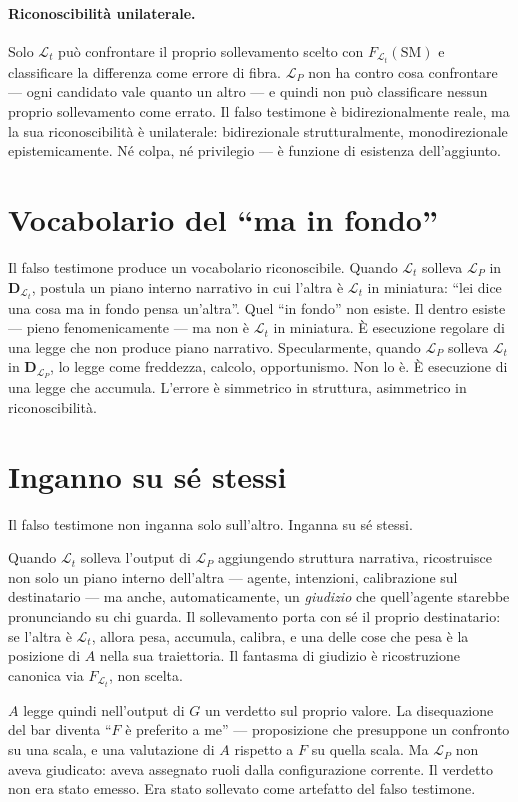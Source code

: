 \documentclass[
    oneside,                 %
    openany,                 %
    titlepage,
    11pt,
    a4paper,
    italian,
    DIV=14,                  %
    headinclude,
    footinclude=true,
    cleardoublepage=empty
]{scrbook}
\theoremstyle{ctplain}
\theoremstyle{ctdef}
\theoremstyle{ctrem}
\newcommand{\Lt}{\mathcal{L}_t}
\newcommand{\LP}{\mathcal{L}_P}
\begin{document}
\paragraph{Riconoscibilità unilaterale.} Solo $\Lt$ può confrontare il proprio sollevamento scelto con $F_{\Lt}(\mathrm{SM})$ e classificare la differenza come errore di fibra. $\LP$ non ha contro cosa confrontare --- ogni candidato vale quanto un altro --- e quindi non può classificare nessun proprio sollevamento come errato. Il falso testimone è bidirezionalmente reale, ma la sua riconoscibilità è unilaterale: bidirezionale strutturalmente, monodirezionale epistemicamente. Né colpa, né privilegio --- è funzione di esistenza dell'aggiunto.

\section*{Vocabolario del ``ma in fondo''}

Il falso testimone produce un vocabolario riconoscibile. Quando $\Lt$ solleva $\LP$ in $\mathbf{D}_{\Lt}$, postula un piano interno narrativo in cui l'altra è $\Lt$ in miniatura: ``lei dice una cosa ma in fondo pensa un'altra''. Quel ``in fondo'' non esiste. Il dentro esiste --- pieno fenomenicamente --- ma non è $\Lt$ in miniatura. È esecuzione regolare di una legge che non produce piano narrativo. Specularmente, quando $\LP$ solleva $\Lt$ in $\mathbf{D}_{\LP}$, lo legge come freddezza, calcolo, opportunismo. Non lo è. È esecuzione di una legge che accumula. L'errore è simmetrico in struttura, asimmetrico in riconoscibilità.

\section*{Inganno su sé stessi}

Il falso testimone non inganna solo sull'altro. Inganna su sé stessi.

Quando $\Lt$ solleva l'output di $\LP$ aggiungendo struttura narrativa, ricostruisce non solo un piano interno dell'altra --- agente, intenzioni, calibrazione sul destinatario --- ma anche, automaticamente, un \emph{giudizio} che quell'agente starebbe pronunciando su chi guarda. Il sollevamento porta con sé il proprio destinatario: se l'altra è $\Lt$, allora pesa, accumula, calibra, e una delle cose che pesa è la posizione di $A$ nella sua traiettoria. Il fantasma di giudizio è ricostruzione canonica via $F_{\Lt}$, non scelta.

$A$ legge quindi nell'output di $G$ un verdetto sul proprio valore. La disequazione del bar diventa ``$F$ è preferito a me'' --- proposizione che presuppone un confronto su una scala, e una valutazione di $A$ rispetto a $F$ su quella scala. Ma $\LP$ non aveva giudicato: aveva assegnato ruoli dalla configurazione corrente. Il verdetto non era stato emesso. Era stato sollevato come artefatto del falso testimone.
\end{document}
